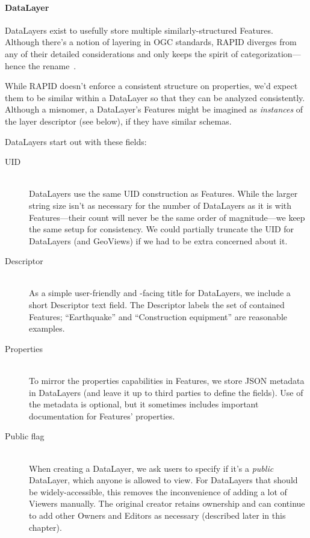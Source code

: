 \paragraph{DataLayer}
DataLayers exist to usefully store multiple similarly-structured Features. Although there's a notion of layering in OGC standards, RAPID diverges from any of their detailed considerations and only keeps the spirit of categorization---hence the rename~\cite{AbstractSpecFaq,SFA,WFS}.

While RAPID doesn't enforce a consistent structure on properties, we'd expect them to be similar within a DataLayer so that they can be analyzed consistently. Although a misnomer, a DataLayer's Features might be imagined as \textit{instances} of the layer descriptor (see below), if they have similar schemas.

DataLayers start out with these fields:

\begin{description}

\item[UID] \hfill \\
DataLayers use the same UID construction as Features. While the larger string size isn't as necessary for the number of DataLayers as it is with Features---their count will never be the same order of magnitude---we keep the same setup for consistency. We could partially truncate the UID for DataLayers (and GeoViews) if we had to be extra concerned about it.

\item[Descriptor] \hfill \\
As a simple user-friendly and -facing title for DataLayers, we include a short Descriptor text field. The Descriptor labels the set of contained Features; ``Earthquake'' and ``Construction equipment'' are reasonable examples.

\item[Properties] \hfill \\
To mirror the properties capabilities in Features, we store JSON metadata in DataLayers (and leave it up to third parties to define the fields). Use of the metadata is optional, but it sometimes includes important documentation for Features' properties.

\item[Public flag] \hfill \\
When creating a DataLayer, we ask users to specify if it's a \textit{public} DataLayer, which anyone is allowed to view. For DataLayers that should be widely-accessible, this removes the inconvenience of adding a lot of Viewers manually. The original creator retains ownership and can continue to add other Owners and Editors as necessary (described later in this chapter).
  
\end{description}

